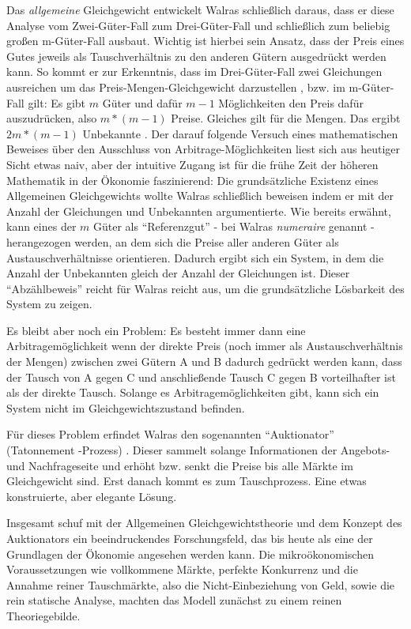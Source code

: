 Das \textit{allgemeine} Gleichgewicht entwickelt Walras schließlich daraus, dass er diese Analyse vom Zwei-Güter-Fall zum Drei-Güter-Fall und schließlich zum beliebig großen m-Güter-Fall ausbaut. Wichtig ist hierbei sein Ansatz, dass der Preis eines Gutes jeweils als Tauschverhältnis zu den anderen Gütern ausgedrückt werden kann. So kommt er zur Erkenntnis, dass im Drei-Güter-Fall zwei Gleichungen ausreichen um das Preis-Mengen-Gleichgewicht darzustellen \parencite[S. 121]{Walras1874}, bzw. im m-Güter-Fall gilt: Es gibt $m$ Güter und dafür $m-1$ Möglichkeiten den Preis dafür auszudrücken, also $m*(m-1)$ Preise. Gleiches gilt für die Mengen. Das ergibt $2m*(m-1)$ Unbekannte \parencite[S. 124]{Walras1874}. Der darauf folgende Versuch eines mathematischen Beweises über den Ausschluss von Arbitrage-Möglichkeiten liest sich aus heutiger Sicht etwas naiv, aber der intuitive Zugang ist für die frühe Zeit der höheren Mathematik in der Ökonomie faszinierend:  Die grundsätzliche Existenz eines Allgemeinen Gleichgewichts wollte Walras schließlich beweisen indem er mit der Anzahl der Gleichungen und Unbekannten argumentierte. Wie bereits erwähnt, kann eines der $m$ Güter als "`Referenzgut"' - bei Walras \textit{numeraire} genannt - herangezogen werden, an dem sich die Preise aller anderen Güter als Austauschverhältnisse orientieren. Dadurch ergibt sich ein System, in dem die Anzahl der Unbekannten gleich der Anzahl der Gleichungen ist. Dieser "`Abzählbeweis"' reicht für Walras reicht aus, um die grundsätzliche Lösbarkeit des System zu zeigen.

Es bleibt aber noch ein Problem: Es besteht immer dann eine Arbitragemöglichkeit wenn der direkte Preis (noch immer als Austauschverhältnis der Mengen) zwischen zwei Gütern A und B dadurch gedrückt werden kann, dass der Tausch von A gegen C und anschließende Tausch C gegen B vorteilhafter ist als der direkte Tausch. Solange es Arbitragemöglichkeiten gibt, kann sich ein System nicht im Gleichgewichtszustand befinden. 

Für dieses Problem erfindet Walras den sogenannten "`Auktionator"' (Tatonnement -Prozess) \parencite[S. 229]{Walras1874}. Dieser sammelt solange Informationen der Angebots- und Nachfrageseite und erhöht bzw. senkt die Preise bis alle Märkte im Gleichgewicht sind. Erst danach kommt es zum Tauschprozess. Eine etwas konstruierte, aber elegante Lösung.

Insgesamt schuf \textcite{Walras1874} mit der Allgemeinen Gleichgewichtstheorie und dem Konzept des Auktionators ein beeindruckendes Forschungsfeld, das bis heute als eine der Grundlagen der Ökonomie angesehen werden kann. Die mikroökonomischen Voraussetzungen wie vollkommene Märkte, perfekte Konkurrenz und die Annahme reiner Tauschmärkte, also die Nicht-Einbeziehung von Geld, sowie die rein statische Analyse, machten das Modell zunächst zu einem reinen Theoriegebilde. 

